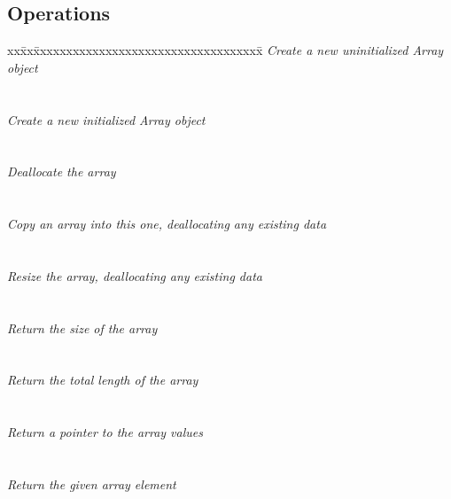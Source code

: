 \documentclass{book}
\begin{document}
\subsection{Operations}

\begin{tabbing}
xx\=xx\=xxxxxxxxxxxxxxxxxxxxxxxxxxxxxxxxxxx\= \kill
\> \todo \> \textit{Create a new uninitialized Array object} \\
\>       \>  \\ \\
\> \todo \> \textit{Create a new initialized Array object} \\
\>       \>  \\ \\
\> \todo \> \textit{Deallocate the array} \\
\>       \>   \\ \\
\> \todo \> \textit{Copy an array into this one, deallocating any existing data} \\
\>       \>   \\ \\
\> \todo \> \textit{Resize the array, deallocating any existing data} \\
\>       \>    \\ \\
\> \todo \> \textit{Return the size of the array} \\
\>       \>   \\ \\
\> \todo \> \textit{Return the total length of the array} \\
\>       \>   \\ \\
\> \todo \> \textit{Return a pointer to the array values} \\
\>       \>   \\ \\
\> \todo \> \textit{Return the given array element} \\
\>       \> 
\end{tabbing}
\end{document}
